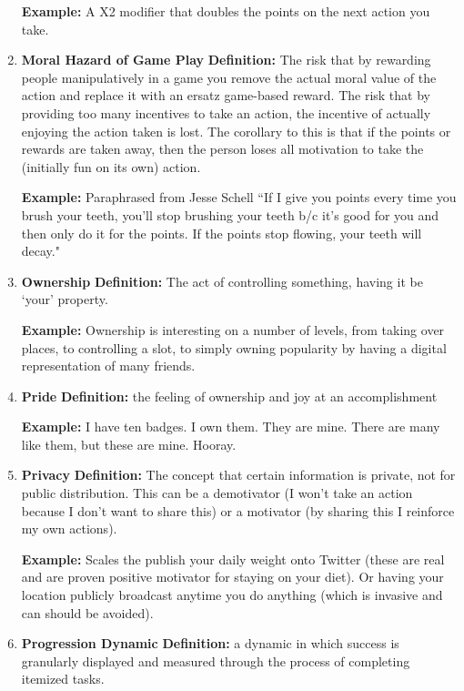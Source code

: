 \begin{enumerate}
\textbf{Example:} A X2 modifier that doubles the points on the next action you take.

\item \textbf{Moral Hazard of Game Play}
\textbf{Definition:} The risk that by rewarding people manipulatively in a game you remove the actual moral value of the action and replace it with an ersatz game-based reward. The risk that by providing too many incentives to take an action, the incentive of actually enjoying the action taken is lost. The corollary to this is that if the points or rewards are taken away, then the person loses all motivation to take the (initially fun on its own) action.

\textbf{Example:} Paraphrased from Jesse Schell ``If I give you points every time you brush your teeth, you’ll stop brushing your teeth b/c it’s good for you and then only do it for the points. If the points stop flowing, your teeth will decay."

\item \textbf{Ownership}
\textbf{Definition:} The act of controlling something, having it be `your' property.

\textbf{Example:} Ownership is interesting on a number of levels, from taking over places, to controlling a slot, to simply owning popularity by having a digital representation of many friends.

\item \textbf{Pride}
\textbf{Definition:} the feeling of ownership and joy at an accomplishment

\textbf{Example:} I have ten badges. I own them. They are mine. There are many like them, but these are mine. Hooray.

\item \textbf{Privacy}
\textbf{Definition:} The concept that certain information is private, not for public distribution. This can be a demotivator (I won’t take an action because I don’t want to share this) or a motivator (by sharing this I reinforce my own actions).

\textbf{Example:} Scales the publish your daily weight onto Twitter (these are real and are proven positive motivator for staying on your diet). Or having your location publicly broadcast anytime you do anything (which is invasive and can should be avoided).

\item \textbf{Progression Dynamic}
\textbf{Definition:} a dynamic in which success is granularly displayed and measured through the process of completing itemized tasks.


\end{enumerate}
